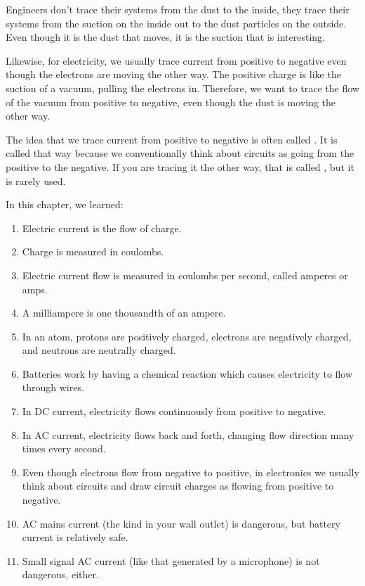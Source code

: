 Engineers don't trace their systems from the dust to the inside, they trace their systems from the suction on the inside out to the dust particles on the outside.
Even though it is the dust that moves, it is the suction that is interesting.

Likewise, for electricity, we usually trace current from positive to negative even though the electrons are moving the other way.
The positive charge is like the suction of a vacuum, pulling the electrons in.
Therefore, we want to trace the flow of the vacuum from positive to negative, even though the dust is moving the other way.

The idea that we trace current from positive to negative is often called .
It is called that way because we conventionally think about circuits as going from the positive to the negative.
If you are tracing it the other way, that is called , but it is rarely used.

\reviewsection

In this chapter, we learned:

\begin{enumerate}
\item Electric current is the flow of charge.
\item Charge is measured in coulombs.
\item Electric current flow is measured in coulombs per second, called amperes or amps.
\item A milliampere is one thousandth of an ampere.
\item In an atom, protons are positively charged, electrons are negatively charged, and neutrons are neutrally charged.
\item Batteries work by having a chemical reaction which causes electricity to flow through wires.
\item In DC current, electricity flows continuously from positive to negative.
\item In AC current, electricity flows back and forth, changing flow direction  many times every second.
\item Even though electrons flow from negative to positive, in electronics we usually think about circuits and draw circuit charges as flowing from positive to negative.
\item AC mains current (the kind in your wall outlet) is dangerous, but battery current is relatively safe.
\item Small signal AC current (like that generated by a microphone) is not dangerous, either.
\end{enumerate}

\applysection


